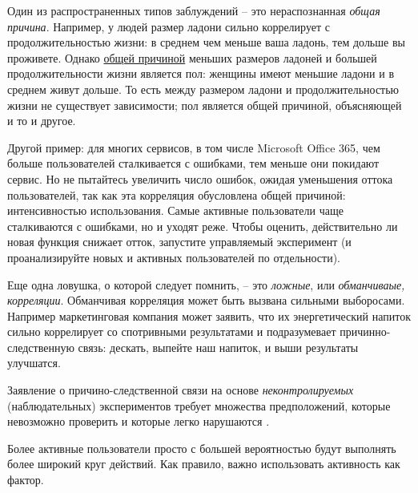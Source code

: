 \documentclass[%
	11pt,
	a4paper,
	utf8,
		]{article}
\begin{document}
Один из распространенных типов заблуждений -- это нераспознанная \emph{общая причина}. Например, у людей размер ладони сильно коррелирует с продолжительностью жизни: в среднем чем меньше ваша ладонь, тем дольше вы проживете. Однако \underline{общей причиной} меньших размеров ладоней и большей продолжительности жизни является пол: женщины имеют меньшие ладони и в среднем живут дольше. То есть между размером ладони и продолжительностью жизни не существует зависимости; пол является общей причиной, объясняющей и то и другое.

Другой пример: для многих сервисов, в том числе Microsoft Office 365, чем больше пользователей сталкивается с ошибками, тем меньше они покидают сервис. Но не пытайтесь увеличить число ошибок, ожидая уменьшения оттока пользователей, так как эта корреляция обусловлена общей причиной: интенсивностью использования. Самые активные пользователи чаще сталкиваются с ошибками, но и уходят реже. Чтобы оценить, действительно ли новая функция снижает отток, запустите управляемый эксперимент (и проанализируйте новых и активных пользователей по отдельности).

Еще одна ловушка, о которой следует помнить, -- это \emph{ложные}, или \emph{обманчиваые, корреляции}. Обманчивая корреляция может быть вызвана сильными выборосами. Например маркетинговая компания может заявить, что их энергетический напиток сильно коррелирует со спотривными результатами и подразумевает причинно-следственную связь: дескать, выпейте наш напиток, и выши результаты улучшатся.

{\color{red}Заявление о причино-следственной связи на основе \emph{неконтролируемых} (наблюдательных) экспериментов требует множества предположений, которые невозможно проверить и которые легко нарушаются} \cite[]{kohavi:ab-tests-2021}. 

Более активные пользователи просто с большей вероятностью будут выполнять более широкий круг действий. Как правило, важно использовать активность как фактор.










\begin{thebibliography}{99}
	
\end{thebibliography}


\end{document}
